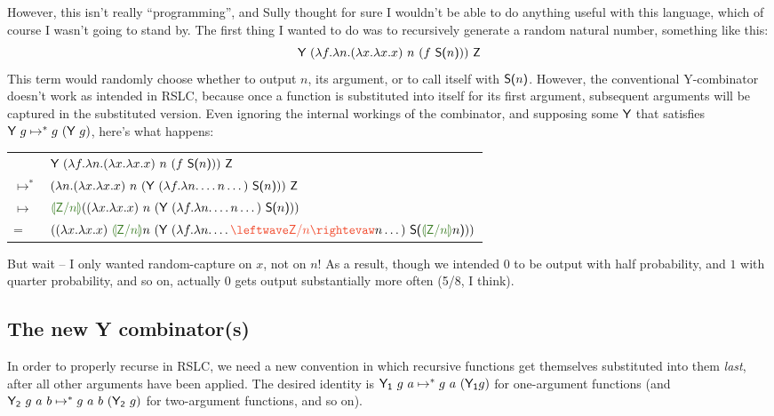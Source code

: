 \documentclass[10pt]{sigplanconf}
\begin{document}
However, this isn't really ``programming'', and Sully thought for sure I wouldn't be able to do anything useful with this language, which of course I wasn't going to stand by. The first thing I wanted to do was to recursively generate a random natural number, something like this:
\begin{equation}
\label{eq:randomnat}
\textsf{Y}~(\lambda f. \lambda n. (\lambda x. \lambda x. x)~n~(f~\textsf{S(}n\textsf{)}))~\textsf{Z}
\end{equation}
This term would randomly choose whether to output $n$, its argument, or to call itself with $\textsf{S(}n\textsf{)}$. However, the conventional Y-combinator doesn't work as intended in RSLC, because once a function is substituted into itself for its first argument, subsequent arguments will be captured in the substituted version.
Even ignoring the internal workings of the combinator, and supposing some $\textsf{Y}$ that satisfies $\textsf{Y}~g \mapsto^* g~(\textsf{Y}~g)$, here's what happens:

\begin{center}
\begin{tabular}{ll}
\hspace{-1em}
& $\textsf{Y}~(\lambda f. \lambda n. (\lambda x. \lambda x. x)~n~(f~\textsf{S(}n\textsf{)}))~\textsf{Z}$ \\
\hspace{-1em}
$\mapsto^*$ & $(\lambda n. (\lambda x. \lambda x. x)~n~(\textsf{Y}~(\lambda f.\lambda n. \dots n \dots)~\textsf{S(}n\textsf{)}))~\textsf{Z}$ \\
\hspace{-1em}
$\mapsto$ & $\subst{\Zero}{n}((\lambda x. \lambda x. x)~n~(\Y~(\lambda f.\lambda n. \dots n \dots)~\Suc{n}))$ \\
\hspace{-1em}
= & $((\lambda x. \lambda x. x)~\subst{\Zero}{n}n~(\Y~(\lambda f.\lambda n. \dots \capture{\Zero}{n}n \dots)~\Suc{\subst{\Zero}{n}n}))$ \\
\end{tabular}
\end{center}

But wait -- I only wanted random-capture on $x$, not on $n$! As a result, though we intended $0$ to be output with half probability, and $1$ with quarter probability, and so on, actually $0$ gets output substantially more often (5/8, I think).

\subsection{The new Y combinator(s)}
In order to properly recurse in RSLC, we need a new convention in which recursive functions get themselves substituted into them {\em last}, after all other arguments have been applied. The desired identity is $\mathsf{Y_1}~g~a \mapsto^* g~a~(\mathsf{Y_1} g)$ for one-argument functions (and $\mathsf{Y_2}~g~a~b \mapsto^* g~a~b~(\mathsf{Y_2}~g)$ for two-argument functions, and so on).
\end{document}
